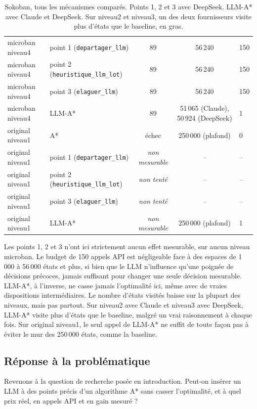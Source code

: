 \documentclass[11pt,a4paper]{article}
\begin{document}
\begin{table}[H]
{\begin{tabular}{@{}llccl@{}}
microban niveau4 & point 1 (\texttt{departager\_llm}) & 89 & 56\,240 & 150 \\
microban niveau4 & point 2 (\texttt{heuristique\_llm\_lot}) & 89 & 56\,240 & 150 \\
microban niveau4 & point 3 (\texttt{elaguer\_llm}) & 89 & 56\,240 & 150 \\
\midrule
microban niveau4 & LLM-A* & 89 & 51\,065 (Claude), 50\,924 (DeepSeek) & 1 \\
\midrule
original niveau1 & A* & échec & 250\,000 (plafond) & 0 \\
original niveau1 & point 1 (\texttt{departager\_llm}) & \emph{non mesurable} & \emph{--} & \emph{--} \\
original niveau1 & point 2 (\texttt{heuristique\_llm\_lot}) & \emph{non tenté} & \emph{--} & \emph{--} \\
original niveau1 & point 3 (\texttt{elaguer\_llm}) & \emph{non tenté} & \emph{--} & \emph{--} \\
\midrule
original niveau1 & LLM-A* & \emph{non mesurable} & 250\,000 (plafond) & 1 \\
\bottomrule
\end{tabular}%
}
\caption{Sokoban, tous les mécanismes comparés. Points 1, 2 et 3 avec
DeepSeek. LLM-A* avec Claude et DeepSeek. Sur niveau2 et niveau3, un des
deux fournisseurs visite plus d'états que le baseline, en gras.}
\label{tab:sokoban-officiel}
\end{table}

Les points 1, 2 et 3 n'ont ici strictement aucun effet mesurable, sur
aucun niveau microban. Le budget de 150 appels API est négligeable face
à des espaces de 1\,000 à 56\,000 états et plus, si bien que le LLM
n'influence qu'une poignée de décisions précoces, jamais suffisant pour
changer une seule décision mesurable. LLM-A*, à l'inverse, ne casse
jamais l'optimalité ici, même avec de vraies dispositions
intermédiaires. Le nombre d'états visités baisse sur la plupart des
niveaux, mais pas partout. Sur niveau2 avec Claude et niveau3 avec
DeepSeek, LLM-A* visite plus d'états que le baseline, malgré un vrai
raisonnement à chaque fois. Sur original niveau1, le seul appel de
LLM-A* ne suffit de toute façon pas à éviter le mur des 250\,000 états,
comme la baseline.

\subsection{Réponse à la problématique}

Revenons à la question de recherche posée en introduction. Peut-on
insérer un LLM à des points précis d'un algorithme A* sans casser
l'optimalité, et à quel prix réel, en appels API et en gain mesuré ?
\end{document}

